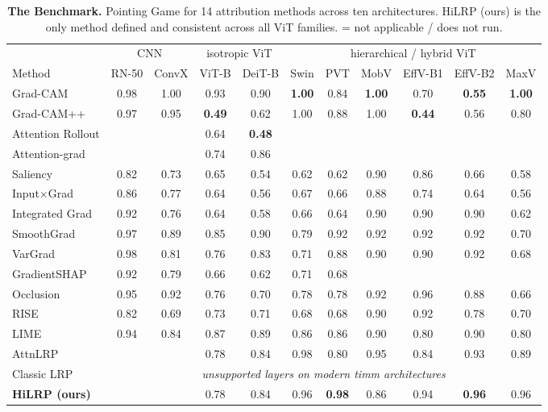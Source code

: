 \documentclass[lettersize,journal]{IEEEtran}
\newcommand{\nd}{\textemdash}            %
\begin{document}
\begin{table}[t]
  \centering
  \caption{\textbf{The Benchmark.} Pointing Game for 14 attribution methods across ten architectures. HiLRP (ours) is the only method defined and consistent across all ViT families. \nd = not applicable / does not run.}
  \label{tab:bigbench}
  \setlength{\tabcolsep}{4pt}
  \scriptsize
  \begin{tabular}{l cc cc cccccc}
    \toprule
    & \multicolumn{2}{c}{CNN} & \multicolumn{2}{c}{isotropic ViT} & \multicolumn{6}{c}{hierarchical / hybrid ViT} \\
    \cmidrule(lr){2-3}\cmidrule(lr){4-5}\cmidrule(lr){6-11}
    Method & RN-50 & ConvX & ViT-B & DeiT-B & Swin & PVT & MobV & EffV-B1 & EffV-B2 & MaxV \\
    \midrule
    Grad-CAM          & 0.98 & 1.00 & 0.93 & 0.90 & \textbf{1.00} & 0.84 & \textbf{1.00} & 0.70 & \textbf{0.55} & \textbf{1.00} \\
    Grad-CAM++        & 0.97 & 0.95 & \textbf{0.49} & 0.62 & 1.00 & 0.88 & 1.00 & \textbf{0.44} & 0.56 & 0.80 \\
    Attention Rollout & \nd & \nd & 0.64 & \textbf{0.48} & \nd & \nd & \nd & \nd & \nd & \nd \\
    Attention-grad    & \nd & \nd & 0.74 & 0.86 & \nd & \nd & \nd & \nd & \nd & \nd \\
    Saliency          & 0.82 & 0.73 & 0.65 & 0.54 & 0.62 & 0.62 & 0.90 & 0.86 & 0.66 & 0.58 \\
    Input$\times$Grad & 0.86 & 0.77 & 0.64 & 0.56 & 0.67 & 0.66 & 0.88 & 0.74 & 0.64 & 0.56 \\
    Integrated Grad   & 0.92 & 0.76 & 0.64 & 0.58 & 0.66 & 0.64 & 0.90 & 0.90 & 0.90 & 0.62 \\
    SmoothGrad        & 0.97 & 0.89 & 0.85 & 0.90 & 0.79 & 0.92 & 0.92 & 0.92 & 0.92 & 0.70 \\
    VarGrad           & 0.98 & 0.81 & 0.76 & 0.83 & 0.71 & 0.88 & 0.90 & 0.90 & 0.92 & 0.68 \\
    GradientSHAP      & 0.92 & 0.79 & 0.66 & 0.62 & 0.71 & 0.68 & \nd & \nd & \nd & \nd \\
    Occlusion         & 0.95 & 0.92 & 0.76 & 0.70 & 0.78 & 0.78 & 0.92 & 0.96 & 0.88 & 0.66 \\
    RISE              & 0.82 & 0.69 & 0.73 & 0.71 & 0.68 & 0.68 & 0.90 & 0.92 & 0.78 & 0.70 \\
    LIME              & 0.94 & 0.84 & 0.87 & 0.89 & 0.86 & 0.86 & 0.90 & 0.80 & 0.90 & 0.80 \\
    AttnLRP           & \nd & \nd & 0.78 & 0.84 & 0.98 & 0.80 & 0.95 & 0.84 & 0.93 & 0.89 \\
    Classic LRP       & \multicolumn{10}{c}{\emph{unsupported layers on modern timm architectures}} \\
    \midrule
    \textbf{HiLRP (ours)} & \nd & \nd & 0.78 & 0.84 & 0.96 & \textbf{0.98} & 0.86 & 0.94 & \textbf{0.96} & 0.96 \\
    \bottomrule
  \end{tabular}
\end{table}
\end{document}
